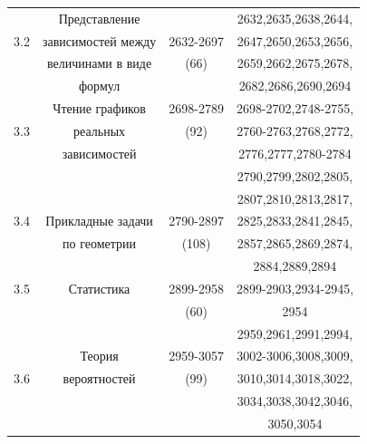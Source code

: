 \begin{table}[H]
\begin{center}
\begin{tabular}{|c|c|c|c|}

\hline
~ & Представление & ~ & 2632,2635,2638,2644,\\
3.2 & зависимостей между & 2632-2697 & 2647,2650,2653,2656,\\
~ & величинами в виде & (66) & 2659,2662,2675,2678,\\
~ & формул & ~ & 2682,2686,2690,2694\\
\hline
~ & Чтение графиков & 2698-2789 & 2698-2702,2748-2755,\\
3.3 & реальных & (92) & 2760-2763,2768,2772,\\
~ & зависимостей & ~ & 2776,2777,2780-2784\\
\hline
~ & ~ & ~ & 2790,2799,2802,2805,\\
~ & ~ & ~ & 2807,2810,2813,2817,\\
3.4 & Прикладные задачи & 2790-2897 & 2825,2833,2841,2845,\\
~ & по геометрии & (108) & 2857,2865,2869,2874,\\
~ & ~ & ~ & 2884,2889,2894\\
\hline
3.5 & Статистика & 2899-2958 & 2899-2903,2934-2945,\\
~ & ~ & (60) & 2954\\
\hline
~ & ~ & ~ & 2959,2961,2991,2994,\\
~ & Теория & 2959-3057 & 3002-3006,3008,3009,\\
3.6 & вероятностей & (99) & 3010,3014,3018,3022,\\
~ & ~ & ~ & 3034,3038,3042,3046,\\
~ & ~ & ~ & 3050,3054\\
\hline
\end{tabular}
\end{center}
\end{table}




